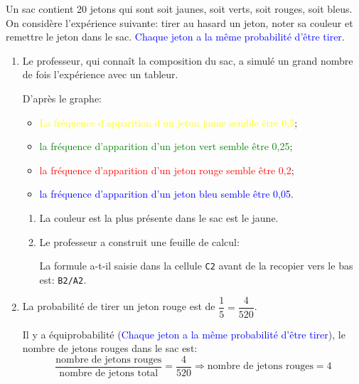 Un sac contient 20 jetons qui sont soit jaunes, soit verts, soit rouges, soit bleus. On considère l'expérience suivante: tirer au hasard un jeton, noter sa couleur et remettre le jeton dans le sac. \textcolor{blue}{Chaque jeton a la même probabilité d'être tirer}.
\begin{enumerate}
\item Le professeur, qui connaît la composition du sac, a simulé un grand nombre de fois l'expérience avec un tableur.

D'après le graphe:
\begin{itemize}
\item \textcolor{yellow}{La fréquence d'apparition d'un jeton jaune semble être 0,5};
\item \textcolor{green}{la fréquence d'apparition d'un jeton vert semble être 0,25};
\item \textcolor{red}{la fréquence d'apparition d'un jeton rouge semble être 0,2};
\item \textcolor{blue}{la fréquence d'apparition d'un jeton bleu semble être 0,05}.
\end{itemize} 
\begin{enumerate}
\item La couleur est la plus présente dans le sac est le jaune.
\item Le professeur a construit une feuille de calcul:

La formule a-t-il saisie dans la cellule \texttt{C2} avant de la recopier vers le bas est: \texttt{B2/A2}.
\end{enumerate}
\item La probabilité de tirer un jeton rouge est de $\dfrac{1}{5}=\dfrac{4}{520}$.

Il y a équiprobabilité (\textcolor{blue}{Chaque jeton a la même probabilité d'être tirer}), le nombre de jetons rouges dans le sac est:
\[
\frac{\text{nombre de jetons rouges}}{\text{nombre de jetons total}}=\frac{4}{520}\Longrightarrow \text{nombre de jetons rouges}=4
\]
\end{enumerate}

\vspace{0,5cm}

